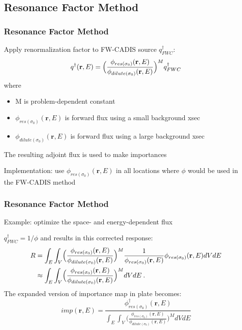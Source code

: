 \documentclass[xcolor=x11names,compress]{beamer}
\renewcommand{\(}{\begin{columns}}
\renewcommand{\)}{\end{columns}}
\newcommand{\<}[1]{\begin{column}{#1}}
\renewcommand{\>}{\end{column}}
\newcommand{\ve}[1]{\ensuremath{\mathbf{#1}}}
\newcommand{\micro}{\ensuremath{\sigma}}
\begin{document}
\subsection{Resonance Factor Method}
\begin{frame}[fragile]
  \frametitle{Resonance Factor Method}
  	Apply renormalization factor to FW-CADIS source $q^{\dagger}_{FWC}$: 
	\begin{equation}
   	q^{\dagger}(\ve{r},E) = \Bigl(\frac{\phi_{res(\micro_0)}(\ve{r},E)}{\phi_{dilute(\micro_0)}(\ve{r},E)}\Bigr)^M q^{\dagger}_{FWC} 
  	 \label{eq:newQ}
	\end{equation}
	where
	\begin{itemize}
  	\item M is problem-dependent constant 
 	 \item $\phi_{res(\micro_0)}(\ve{r},E)$ is forward flux using a small background xsec
 	 \item $\phi_{dilute(\micro_0)}(\ve{r},E)$ is forward flux using a large background xsec
	\end{itemize}
	
	The resulting adjoint flux is used to make importances
	\vspace*{1 em}
	
	Implementation: use $\phi_{res(\micro_0)}(\ve{r},E)$  in all locations where $\phi$ would be used in the FW-CADIS method
	
	
	
\end{frame}

\begin{frame}[fragile]
  \frametitle{Resonance Factor Method}
  
	Example: optimize the space- and energy-dependent flux
	
	\vspace*{1 em}
	$q^{\dagger}_{FWC} = 1 / \phi$ and results in this corrected response: 
	\begin{align}
 	R &= \int_E \int_{V} \Bigl(\frac{\phi_{res(\micro_0)}(\ve{r},E)}{\phi_{dilute(\micro_0)}(\ve{r},E)}\Bigr)^M \frac{1}{\phi_{res(\micro_0)}(\ve{r}, E)} \phi_{res(\micro_0)}(\ve{r}, E) dV dE \nonumber
 	\label{eq:newResponse} \\
  	 &\approx \int_E \int_{V} \Bigl(\frac{\phi_{res(\micro_0)}(\ve{r},E)}{\phi_{dilute(\micro_0)}(\ve{r},E)}\Bigr)^M dV dE \:. \nonumber
	\end{align}
	The expanded version of importance map in plate becomes:
	\begin{equation}
 imp(\ve{r},E)= \frac{\phi_{res(\micro_0)}^{\dagger}(\ve{r},E)}{\int_E \int_{V} \bigl(\frac{\phi_{res(\micro_0)}(\ve{r},E)}{\phi_{dilute(\micro_0)}(\ve{r},E)}\bigr)^M dV dE}
 	 \label{eq:newImp}
	\end{equation}  
  
\end{frame}
\end{document}
